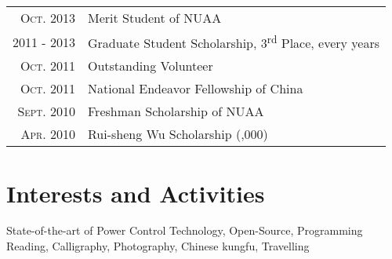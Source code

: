 \documentclass[a4paper,10pt]{article} %
\newcommand{\redf}[1]{\textcolor[rgb]{1,0,0}{#1}}
\begin{document}
\begin{tabular}{rl}
\textsc{Oct.} 2013 & Merit Student of NUAA \\
2011 - 2013 & Graduate Student Scholarship, 3\textsuperscript{rd} Place, every years \\
\textsc{Oct.} 2011 & Outstanding Volunteer \\
\textsc{Oct.} 2011 & National Endeavor Fellowship of China \\
\textsc{Sept.} 2010 & Freshman Scholarship of NUAA \\
\textsc{Apr.} 2010 & Rui-sheng Wu Scholarship \footnotesize(\redf{\textyen 10,000})\normalsize
\end{tabular}


\section{Interests and Activities}

State-of-the-art of Power Control Technology, Open-Source, Programming\\
Reading, Calligraphy, Photography, Chinese kungfu, Travelling

\end{document}
